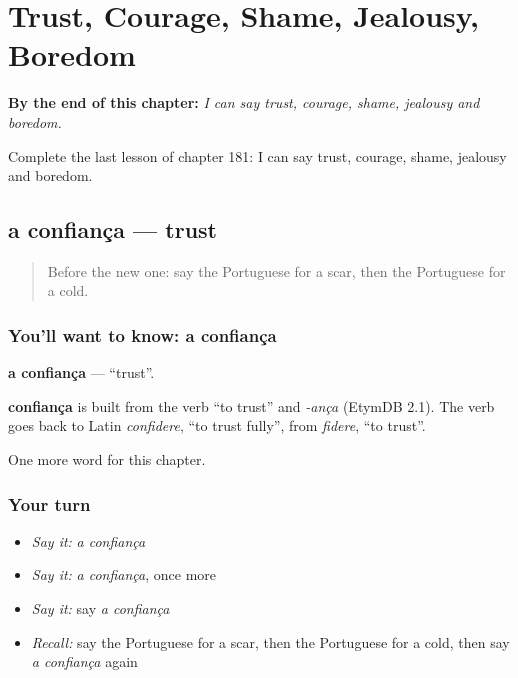 
\chapter{Trust, Courage, Shame, Jealousy, Boredom}
\label{ch:pt-trust-courage-shame-jealousy-boredom}

\begin{chapteropening}
\textbf{By the end of this chapter:} \emph{I can say trust, courage, shame, jealousy and boredom.}

Complete the last lesson of chapter 181: I can say trust, courage, shame, jealousy and boredom.
\end{chapteropening}

\section[a confiança]{a confiança — trust}

\label{lesson:PT-C181-confianca}



\begin{quote}
Before the new one: say the Portuguese for a scar, then the Portuguese for a cold.
\end{quote}

\subsection*{You'll want to know: a confiança}
\textbf{a confiança} — \textquotedblleft{}trust\textquotedblright{}.

\begin{cousinweb}
\textbf{confiança} is built from the verb \textquotedblleft{}to trust\textquotedblright{} and \emph{-ança} (EtymDB 2.1). The verb goes back to Latin \emph{confidere}, \textquotedblleft{}to trust fully\textquotedblright{}, from \emph{fidere}, \textquotedblleft{}to trust\textquotedblright{}.
\end{cousinweb}

\begin{grammarlens}[title={What you've built}]
One more word for this chapter.
\end{grammarlens}

\subsection*{Your turn}
\begin{itemize}
\raggedright
  \item \emph{Say it:} \emph{a confiança}
  \item \emph{Say it:} \emph{a confiança}, once more
  \item \emph{Say it:} say \emph{a confiança}
  \item \emph{Recall:} say the Portuguese for a scar, then the Portuguese for a cold, then say \emph{a confiança} again
\end{itemize}

